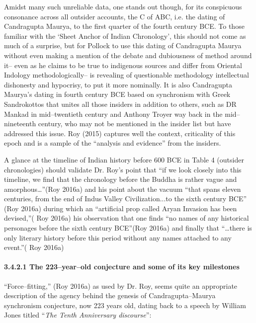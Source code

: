 Amidst many such unreliable data, one stands out though, for its conspicuous consonance across all outsider accounts, the C of ABC, i.e. the dating of Candragupta Maurya, to the first quarter of the fourth century BCE. To those familiar with the ‘Sheet Anchor of Indian Chronology’, this should not come as much of a surprise, but for Pollock to use this dating of Candragupta Maurya without even making a mention of the debate and dubiousness of method around it– even as he claims to be true to indigenous sources and differ from Oriental Indology methodologically– is revealing of questionable methodology intellectual dishonesty and hypocrisy, to put it more nominally. It is also Candragupta Maurya’s dating in fourth century BCE based on synchronism with Greek Sandrokottos that unites all those insiders in addition to others, such as DR Mankad in mid–twentieth century and Anthony Troyer way back in the mid–nineteenth century, who may not be mentioned in the insider list but have addressed this issue. Roy (2015) captures well the context, criticality of this epoch and is a sample of the “analysis and evidence” from the insiders.

A glance at the timeline of Indian history before 600 BCE in Table 4 (outsider chronologies) should validate Dr. Roy’s point that “if we look closely into this timeline, we find that the chronology before the Buddha is rather vague and amorphous…”(Roy 2016a) and his point about the vacuum “that spans eleven centuries, from the end of Indus Valley Civilization...to the sixth century BCE” (Roy 2016a) during which an “artificial prop called Aryan Invasion has been devised,”( Roy 2016a) his observation that one finds “no names of any historical personages before the sixth century BCE”(Roy 2016a) and finally that “…there is only literary history before this period without any names attached to any event.”( Roy 2016a)

\paragraph*{3.4.2.1 The 223–year–old conjecture and some of its key milestones}

“Force–fitting,” (Roy 2016a) as used by Dr. Roy, seems quite an appropriate description of the agency behind the genesis of Candragupta–Maurya synchronism conjecture, now 223 years old, dating back to a speech by William Jones titled “\textit{The Tenth Anniversary discourse}”:


